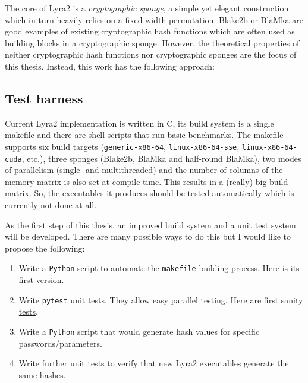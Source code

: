 \documentclass[a4paper,10pt,english]{INSOexpose}
\begin{document}
The core of Lyra2 \cite{Andrade:2016:Lyra2} is a \emph{cryptographic sponge}, a simple yet elegant construction which in turn heavily relies on a fixed-width permutation. Blake2b \cite{Aumasson:2013:BLAKE2} or BlaMka \cite{Andrade:2016:Lyra2} are good examples of existing cryptographic hash functions which are often used as building blocks in a cryptographic sponge. However, the theoretical properties of neither cryptographic hash functions nor cryptographic sponges are the focus of this thesis. Instead, this work has the following approach:

\subsection{Test harness}
\label{subsection:test-harness}

Current Lyra2 implementation is written in C, its build system is a single makefile and there are shell scripts that run basic benchmarks. The makefile supports six build targets (\texttt{generic-x86-64}, \texttt{linux-x86-64-sse}, \texttt{linux-x86-64-cuda}, etc.), three sponges (Blake2b, BlaMka and half-round BlaMka), two modes of parallelism (single- and multithreaded) and the number of columns of the memory matrix is also set at compile time. This results in a (really) big build matrix. So, the executables it produces should be tested automatically which is currently not done at all.

As the first step of this thesis, an improved build system and a unit test system will be developed. There are many possible ways to do this but I would like to propose the following:

\begin{enumerate}
\item Write a \texttt{Python} script to automate the \texttt{makefile} building process. Here is
  \href{https://github.com/all3fox/Lyra/blob/91cc07252ac65370134b4b02cce3cb29fbf3efc1/Lyra2/tests/build_lyra2.py}{its first version}.
\item Write \texttt{pytest} unit tests. They allow easy parallel testing. Here are \href{https://github.com/all3fox/Lyra/blob/91cc07252ac65370134b4b02cce3cb29fbf3efc1/Lyra2/tests/build_lyra2.py}{first sanity tests}.
\item Write a \texttt{Python} script that would generate hash values for specific passwords/parameters.
\item Write further unit tests to verify that new Lyra2 executables generate the same hashes.
\end{enumerate}
\end{document}

